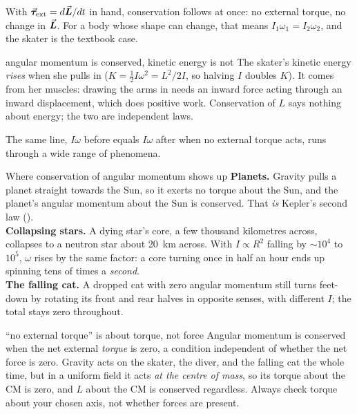 With $\vec{\bm{\tau}}_{\text{ext}}=d\vec{\bm{L}}/dt$ in hand, conservation follows at once: no external torque, no change in
$\vec{\bm{L}}$. For a body whose shape can change, that means $I_1\omega_1=I_2\omega_2$, and the skater is the
textbook case.

\begin{figure}[htbp]
\centering
{}
\end{figure}

\begin{trapbox}{angular momentum is conserved, kinetic energy is not}
The skater's kinetic energy \emph{rises} when she pulls in ($K=\tfrac{1}{2}I\omega^2=L^2/2I$, so halving
$I$ doubles $K$). It comes from her muscles: drawing the arms in needs an inward force acting through an
inward displacement, which does positive work. Conservation of $L$ says nothing about energy; the two are
independent laws.
\end{trapbox}

The same line, $I\omega$ before equals $I\omega$ after when no external torque acts, runs through a wide range of phenomena.

\begin{remarkbox}{Where conservation of angular momentum shows up}
\textbf{Planets.} Gravity pulls a planet straight towards the Sun, so it exerts no torque about the Sun,
and the planet's angular momentum about the Sun is conserved. That \emph{is} Kepler's second law
().\\[3pt]
\textbf{Collapsing stars.} A dying star's core, a few thousand kilometres across, collapses to a neutron
star about \SI{20}{km} across. With $I\propto R^2$ falling by $\sim10^4$ to $10^5$, $\omega$ rises by the
same factor: a core turning once in half an hour ends up spinning tens of times a \emph{second}.\\[3pt]
\textbf{The falling cat.} A dropped cat with zero angular momentum still turns feet-down by rotating its
front and rear halves in opposite senses, with different $I$; the total stays zero throughout.
\end{remarkbox}

\begin{trapbox}{``no external torque'' is about torque, not force}
Angular momentum is conserved when the net external \emph{torque} is zero, a condition independent of
whether the net force is zero. Gravity acts on the skater, the diver, and the falling cat the whole time,
but in a uniform field it acts \emph{at the centre of mass}, so its torque about the CM is zero, and $L$
about the CM is conserved regardless. Always check torque about your chosen axis, not whether forces are
present.
\end{trapbox}

